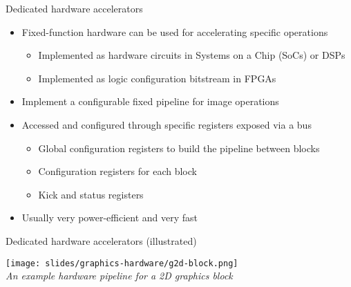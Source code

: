 \begin{frame}{Dedicated hardware accelerators}
  \begin{itemize}
  \item Fixed-function hardware can be used for accelerating specific operations
  \begin{itemize}
    \item Implemented as hardware circuits in Systems on a Chip (SoCs) or DSPs
    \item Implemented as logic configuration bitstream in FPGAs
  \end{itemize}
  \item Implement a configurable fixed pipeline for image operations
  \item Accessed and configured through specific registers exposed via a bus
    \begin{itemize}
    \item Global configuration registers to build the pipeline between blocks
    \item Configuration registers for each block
    \item Kick and status registers
    \end{itemize}
  \item Usually very power-efficient and very fast
  \end{itemize}
\end{frame}

\begin{frame}{Dedicated hardware accelerators (illustrated)}
  \begin{center}
    \texttt{[image: slides/graphics-hardware/g2d-block.png]}\\
    \textit{An example hardware pipeline for a 2D graphics block}\\
  \end{center}
\end{frame}

